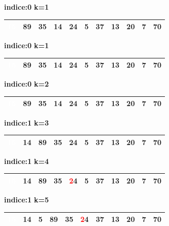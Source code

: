 \documentclass[10pt,a4paper,spanish]{report}
\theoremstyle{definition}
\theoremstyle{remark}
\begin{document}
\textbf{indice:0}
\textbf{k=1}
\begin{center}
\begin{tabular}{|c|c|c|c|c|c|c|c|c|c|c|}
\hline
\cellcolor{blue} \textcolor{white}{15}& 89 & 35 & 14 & 24 & 5 & 37 & 13 & 20 & 7 & 70 \\
\hline  
\end{tabular}
\end{center}
\textbf{indice:0}
\textbf{k=1}
\begin{center}
\begin{tabular}{|c|c|c|c|c|c|c|c|c|c|c|}
\hline
\cellcolor{blue} \textcolor{white}{15}& \cellcolor{red}89 & 35 & 14 & 24 & 5 & 37 & 13 & 20 & 7 & 70 \\
\hline  
\end{tabular}
\end{center}
\textbf{indice:0}
\textbf{k=2}
\begin{center}
\begin{tabular}{|c|c|c|c|c|c|c|c|c|c|c|}
\hline
\cellcolor{blue} \textcolor{white}{15}& \cellcolor{red}89 &\cellcolor{red} 35 & 14 & 24 & 5 & 37 & 13 & 20 & 7 & 70 \\
\hline  
\end{tabular}
\end{center}
\textbf{indice:1}
\textbf{k=3}
\begin{center}
\begin{tabular}{|c|c|c|c|c|c|c|c|c|c|c|}
\hline
\cellcolor{blue} \textcolor{white}{15} & 14 & \cellcolor{red}89 & \cellcolor{red} 35 & 24 & 5 & 37 & 13 & 20 & 7 & 70 \\
\hline  
\end{tabular}
\end{center}
\textbf{indice:1}
\textbf{k=4}
\begin{center}
\begin{tabular}{|c|c|c|c|c|c|c|c|c|c|c|}
\hline
\cellcolor{blue} \textcolor{white}{15} & 14 & \cellcolor{red}89 & \cellcolor{red} 35 & \textcolor{red}24 & 5 & 37 & 13 & 20 & 7 & 70 \\
\hline  
\end{tabular}
\end{center}
\textbf{indice:1}
\textbf{k=5}
\begin{center}
\begin{tabular}{|c|c|c|c|c|c|c|c|c|c|c|}
\hline
\cellcolor{blue} \textcolor{white}{15} & 14 & 5 & \cellcolor{red}89 & \cellcolor{red} 35 & \textcolor{red}24 & 37 & 13 & 20 & 7 & 70 \\
\hline  
\end{tabular}
\end{center}
\end{document}
